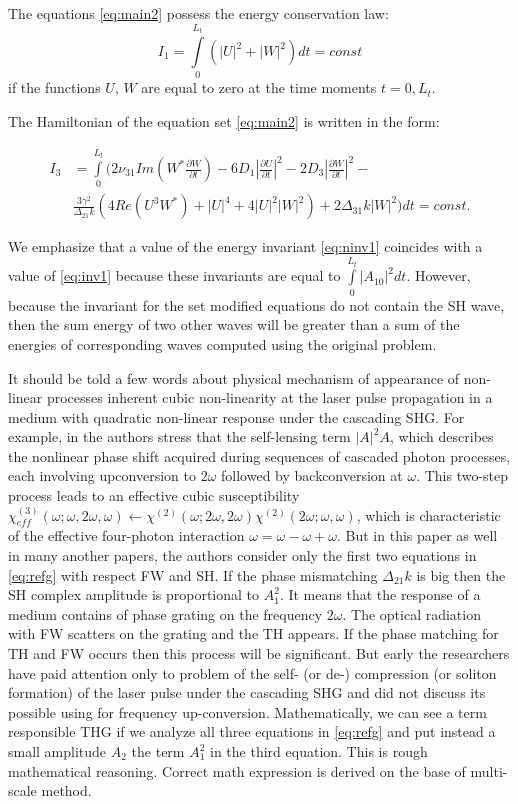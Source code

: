 \documentclass[a4paper, 12pt, onecolumn]{extarticle}
\begin{document}
The equations  \eqref{eq:main2} possess the energy conservation law: 
\begin{equation}
\label{eq:ninv1}
I_1=\int\limits_0^{L_t}\left(|U|^2+|W|^2\right)dt=const
\end{equation}
if the functions \(U,\,W\) are equal to zero at the time moments \(t=0,L_t\).  

The Hamiltonian of the equation set \eqref{eq:main2} is written in the form:

\begin{equation}
\label{eq:ninv3}
\begin{aligned}
I_3&=\int\limits_0^{L_t}\Big(2\nu_{31}Im\left(W^*\frac{\partial W}{\partial t}\right)-6D_1|\frac{\partial U}{\partial t}|^2-2D_3|\frac{\partial W}{\partial t}|^2-\\
&\frac{3\gamma^2}{\Delta_{21}k}\left(4Re(U^3W^*)+|U|^4+4|U|^2|W|^2\right)+2\Delta_{31}k|W|^2\Big)dt=const.
\end{aligned}
\end{equation}

We  emphasize that a value of the energy invariant \eqref{eq:ninv1} coincides with a value of  \eqref{eq:inv1} because these invariants are equal to \(\int\limits_0^{L_t}|A_{10}|^2dt\). However, because the invariant for the  set modified equations do not contain the SH wave, then the sum energy of two other waves will be greater than a sum of the energies of corresponding waves computed using the original problem.

It should be told a few words about physical mechanism of appearance of  non-linear processes inherent cubic non-linearity at the laser pulse propagation in a medium with quadratic non-linear response under the cascading SHG. For example, in  \cite{bib:n19} the authors stress that the self-lensing term $|A|^2A$, which describes the nonlinear phase shift acquired during sequences of cascaded photon processes, each involving upconversion to $2\omega$ followed by backconversion at $\omega$. This two-step process leads to an effective cubic susceptibility $\chi_{eff}^{(3)}(\omega; \omega,2\omega,\omega) \leftarrow \chi^{(2)}(\omega; 2\omega,2\omega)\chi^{(2)}(2\omega; \omega,\omega)$, which is characteristic of the effective four-photon interaction $\omega=\omega-\omega+\omega$. But in this paper as well in many another papers, the authors consider only the first two equations in \eqref{eq:refg} with respect FW and SH. If the phase mismatching $\Delta_{21}k$ is big then the SH complex amplitude is proportional to $A_1^2$. It means that the response of a medium  contains of phase grating  on the frequency $2\omega$. The optical radiation with FW scatters on the grating and the TH appears. If the phase matching for TH and FW occurs then this process will be significant. But early the researchers have paid attention only to problem of the self- (or de-) compression (or soliton formation) of the laser pulse  under the cascading SHG and did not discuss its possible using for frequency up-conversion. Mathematically, we can see a term responsible THG if we analyze all three equations in \eqref{eq:refg} and put instead a small amplitude $A_2$ the term  $A_1^2$ in the third equation. This is rough mathematical reasoning. Correct math expression is derived on the base of multi-scale method. 
\end{document}
